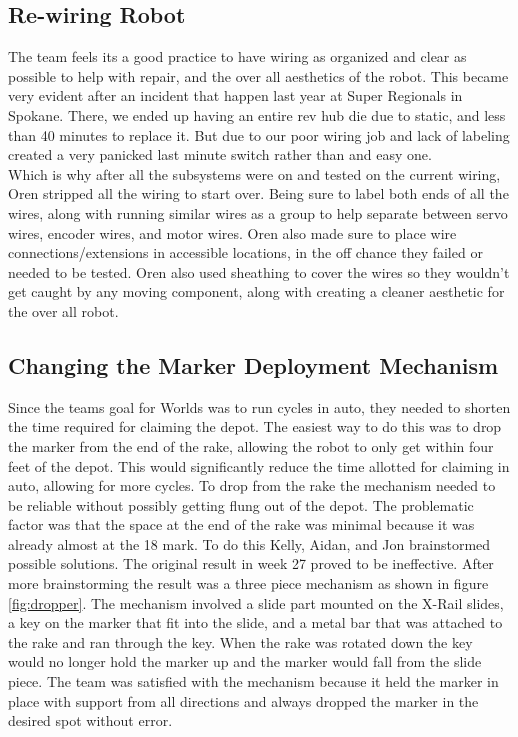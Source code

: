 \documentclass{article}
\begin{document}
\subsection{Re-wiring Robot}
The team feels its a good practice to have wiring as organized and clear as possible to help with repair, and the over all aesthetics of the robot. This became very evident after an incident that happen last year at Super Regionals in Spokane. There, we ended up having an entire rev hub die due to static, and less than 40 minutes to replace it. But due to our poor wiring job and lack of labeling created a very panicked last minute switch rather than and easy one. \\

Which is why after all the subsystems were on and tested on the current wiring, Oren stripped all the wiring to start over. Being sure to label both ends of all the wires, along with running similar wires as a group to help separate between servo wires, encoder wires, and motor wires. Oren also made sure to place wire connections/extensions in accessible locations, in the off chance they failed or needed to be tested. Oren also used sheathing to cover the wires so they wouldn't get caught by any moving component, along with creating a cleaner aesthetic for the over all robot. 

\subsection{Changing the Marker Deployment Mechanism}
Since the teams goal for Worlds was to run cycles in auto, they needed to shorten the time required for claiming the depot. The easiest way to do this was to drop the marker from the end of the rake, allowing the robot to only get within four feet of the depot. This would significantly reduce the time allotted for claiming in auto, allowing for more cycles. To drop from the rake the mechanism needed to be reliable without possibly getting flung out of the depot. The problematic factor was that the space at the end of the rake was minimal because it was already almost at the 18 mark. To do this Kelly, Aidan, and Jon brainstormed possible solutions. The original result in week 27 proved to be ineffective. After more brainstorming the result was a three piece mechanism as shown in figure \ref{fig:dropper}. The mechanism involved a slide part mounted on the X-Rail slides, a key on the marker that fit into the slide, and a metal bar that was attached to the rake and ran through the key. When the rake was rotated down the key would no longer hold the marker up and the marker would fall from the slide piece. The team was satisfied with the mechanism because it held the marker in place with support from all directions and always dropped the marker in the desired spot without error.
\end{document}
